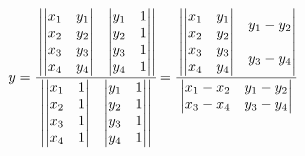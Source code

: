 \begin{remark}
\begin{align*}
  y &= \cfrac{
      \begin{vmatrix}
        \begin{vmatrix} x_1 & y_1 \\ x_2 & y_2 \end{vmatrix} & \begin{vmatrix} y_1 & 1 \\ y_2 & 1 \end{vmatrix} \\
        \begin{vmatrix} x_3 & y_3 \\ x_4 & y_4 \end{vmatrix} & \begin{vmatrix} y_3 & 1 \\ y_4 & 1 \end{vmatrix} 
      \end{vmatrix}}{
      \begin{vmatrix}
        \begin{vmatrix} x_1 & 1 \\ x_2 & 1 \end{vmatrix} & \begin{vmatrix} y_1 & 1 \\ y_2 & 1 \end{vmatrix} \\
        \begin{vmatrix} x_3 & 1 \\ x_4 & 1 \end{vmatrix} & \begin{vmatrix} y_3 & 1 \\ y_4 & 1 \end{vmatrix} 
      \end{vmatrix}}
    = \cfrac{
      \begin{vmatrix}
        \begin{vmatrix} x_1 & y_1 \\ x_2 & y_2 \end{vmatrix} & y_1 - y_2 \\
        \begin{vmatrix} x_3 & y_3 \\ x_4 & y_4 \end{vmatrix} & y_3 - y_4 
      \end{vmatrix}}{
      \begin{vmatrix}
        x_1 - x_2 & y_1 - y_2 \\
        x_3 - x_4 & y_3 - y_4 
      \end{vmatrix}}
\end{align*}


\end{remark}
